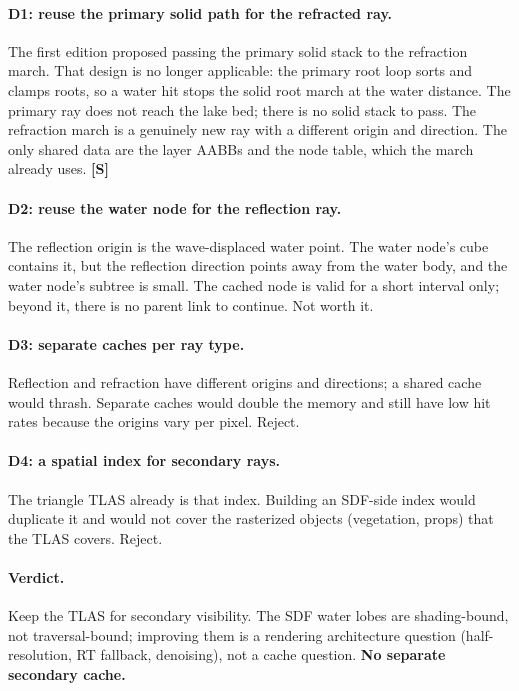 \documentclass[11pt,a4paper]{article}
\newcommand{\evS}{\textsf{\textbf{\color{evS}[S]}}}
\theoremstyle{plain}
\theoremstyle{definition}
\theoremstyle{remark}
\begin{document}
\paragraph{D1: reuse the primary solid path for the refracted ray.} The first
edition proposed passing the primary solid stack to the refraction march. That
design is no longer applicable: the primary root loop sorts and clamps roots,
so a water hit stops the solid root march at the water distance. The primary
ray does not reach the lake bed; there is no solid stack to pass. The
refraction march is a genuinely new ray with a different origin and direction.
The only shared data are the layer AABBs and the node table, which the march
already uses. \evS

\paragraph{D2: reuse the water node for the reflection ray.} The reflection
origin is the wave-displaced water point. The water node's cube contains it,
but the reflection direction points away from the water body, and the water
node's subtree is small. The cached node is valid for a short interval only;
beyond it, there is no parent link to continue. Not worth it.

\paragraph{D3: separate caches per ray type.} Reflection and refraction have
different origins and directions; a shared cache would thrash. Separate caches
would double the memory and still have low hit rates because the origins vary
per pixel. Reject.

\paragraph{D4: a spatial index for secondary rays.} The triangle TLAS already
is that index. Building an SDF-side index would duplicate it and would not
cover the rasterized objects (vegetation, props) that the TLAS covers. Reject.

\paragraph{Verdict.} Keep the TLAS for secondary visibility. The SDF water
lobes are shading-bound, not traversal-bound; improving them is a rendering
architecture question (half-resolution, RT fallback, denoising), not a cache
question. \textbf{No separate secondary cache.}
\end{document}
